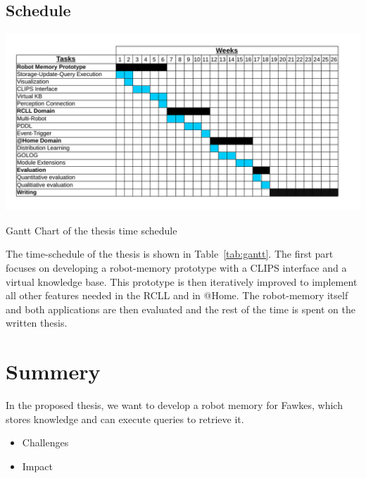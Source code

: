 \documentclass[a4paper,11pt]{article}
\newcommand{\reftab}[1]{Table~\ref{#1}}
\begin{document}
\subsection{Schedule}
\begin{table}
  \centering
  \includegraphics[width=\textwidth]{gantt-chart}%
  \vspace{-5mm}
  \caption{Gantt Chart of the thesis time schedule}
  \label{tab:gantt}
\end{table}
The time-schedule of the thesis is shown in \reftab{tab:gantt}. The
first part focuses on developing a robot-memory prototype with a CLIPS
interface and a virtual knowledge base. This prototype is then
iteratively improved to implement all other features needed in the
RCLL and in @Home. The robot-memory itself and both applications are
then evaluated and the rest of the time is spent on the written
thesis.

\section{Summery}
\label{sec:summery}
In the proposed thesis, we want to develop a robot memory for Fawkes,
which stores knowledge and can execute queries to retrieve it. 

\begin{itemize}
\item Challenges
\item Impact
\end{itemize}




\end{document}
